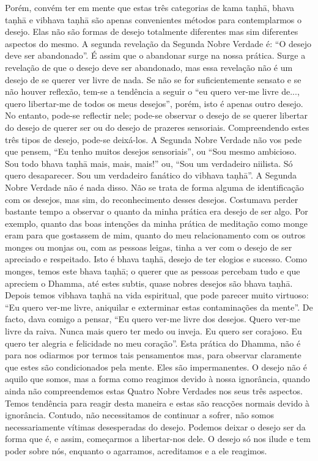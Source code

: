 Porém, convém ter em mente que estas três categorias de
kama taṇhā, bhava taṇhā e vibhava taṇhā são apenas convenientes métodos para contemplarmos o desejo. Elas não são
formas de desejo totalmente diferentes mas sim diferentes
aspectos do mesmo.
A segunda revelação da Segunda Nobre Verdade é: “O
desejo deve ser abandonado”. É assim que o abandonar surge
na nossa prática. Surge a revelação de que o desejo deve ser
abandonado, mas essa revelação não é um desejo de se querer
ver livre de nada. Se não se for suficientemente sensato e se
não houver reflexão, tem-se a tendência a seguir o “eu quero
ver-me livre de..., quero libertar-me de todos os meus desejos”, porém, isto é apenas outro desejo. No entanto, pode-se
reflectir nele; pode-se observar o desejo de se querer libertar do desejo de querer ser ou do desejo de prazeres sensoriais. Compreendendo estes três tipos de desejo, pode-se
deixá-los.
A Segunda Nobre Verdade não vos pede que pensem,
“Eu tenho muitos desejos sensoriais”, ou “Sou mesmo ambicioso. Sou todo bhava taṇhā mais, mais, mais!” ou, “Sou um
verdadeiro niilista. Só quero desaparecer. Sou um verdadeiro
fanático do vibhava taṇhā”. A Segunda Nobre Verdade não é
nada disso. Não se trata de forma alguma de identificação
com os desejos, mas sim, do reconhecimento desses desejos.
Costumava perder bastante tempo a observar o quanto da
minha prática era desejo de ser algo. Por exemplo, quanto das
boas intenções da minha prática de meditação como monge
eram para que gostassem de mim, quanto do meu relacionamento com os outros monges ou monjas ou, com as pessoas
leigas, tinha a ver com o desejo de ser apreciado e respeitado.
Isto é bhava taṇhā, desejo de ter elogios e sucesso. Como
monges, temos este bhava taṇhā; o querer que as pessoas
percebam tudo e que apreciem o Dhamma, até estes subtis,
quase nobres desejos são bhava taṇhā.
Depois temos vibhava taṇhā na vida espiritual, que pode
parecer muito virtuoso: “Eu quero ver-me livre, aniquilar e
exterminar estas contaminações da mente”. De facto, dava
comigo a pensar, “Eu quero ver-me livre dos desejos. Quero
ver-me livre da raiva. Nunca mais quero ter medo ou inveja.
Eu quero ser corajoso. Eu quero ter alegria e felicidade no
meu coração”.
Esta prática do Dhamma, não é para nos odiarmos por
termos tais pensamentos mas, para observar claramente que
estes são condicionados pela mente. Eles são impermanentes.
O desejo não é aquilo que somos, mas a forma como reagimos
devido à nossa ignorância, quando ainda não compreendemos
estas Quatro Nobre Verdades nos seus três aspectos. Temos
tendência para reagir desta maneira e estas são reacções normais
devido à ignorância.
Contudo, não necessitamos de continuar a sofrer, não
somos necessariamente vítimas desesperadas do desejo.
Podemos deixar o desejo ser da forma que é, e assim, começarmos a libertar-nos dele. O desejo só nos ilude e tem poder sobre
nós, enquanto o agarramos, acreditamos e a ele reagimos.

